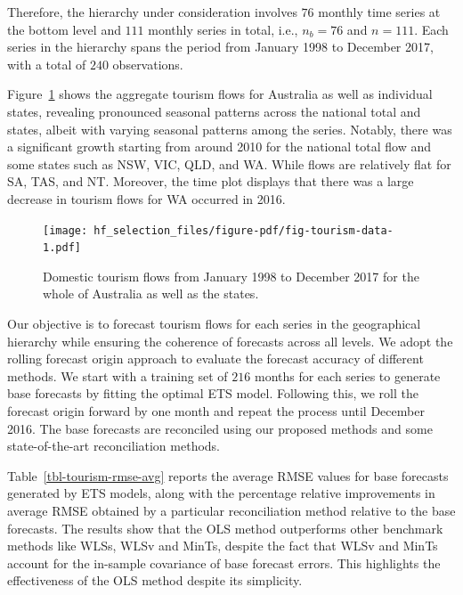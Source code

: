 \documentclass[11pt,a4paper,]{article}
\begin{document}
Therefore, the hierarchy under consideration involves \(76\) monthly
time series at the bottom level and \(111\) monthly series in total,
i.e., \(n_b=76\) and \(n=111\). Each series in the hierarchy spans the
period from January 1998 to December 2017, with a total of \(240\)
observations.

Figure~\ref{fig-tourism-data} shows the aggregate tourism flows for
Australia as well as individual states, revealing pronounced seasonal
patterns across the national total and states, albeit with varying
seasonal patterns among the series. Notably, there was a significant
growth starting from around 2010 for the national total flow and some
states such as NSW, VIC, QLD, and WA. While flows are relatively flat
for SA, TAS, and NT. Moreover, the time plot displays that there was a
large decrease in tourism flows for WA occurred in 2016.

\begin{figure}

{\centering \texttt{[image: hf\_selection\_files/figure-pdf/fig-tourism-data-1.pdf]}

}

\caption{\label{fig-tourism-data}Domestic tourism flows from January
1998 to December 2017 for the whole of Australia as well as the states.}

\end{figure}

Our objective is to forecast tourism flows for each series in the
geographical hierarchy while ensuring the coherence of forecasts across
all levels. We adopt the rolling forecast origin approach to evaluate
the forecast accuracy of different methods. We start with a training set
of \(216\) months for each series to generate base forecasts by fitting
the optimal ETS model. Following this, we roll the forecast origin
forward by one month and repeat the process until December 2016. The
base forecasts are reconciled using our proposed methods and some
state-of-the-art reconciliation methods.

Table~\ref{tbl-tourism-rmse-avg} reports the average RMSE values for
base forecasts generated by ETS models, along with the percentage
relative improvements in average RMSE obtained by a particular
reconciliation method relative to the base forecasts. The results show
that the OLS method outperforms other benchmark methods like WLSs, WLSv
and MinTs, despite the fact that WLSv and MinTs account for the
in-sample covariance of base forecast errors. This highlights the
effectiveness of the OLS method despite its simplicity.
\end{document}
